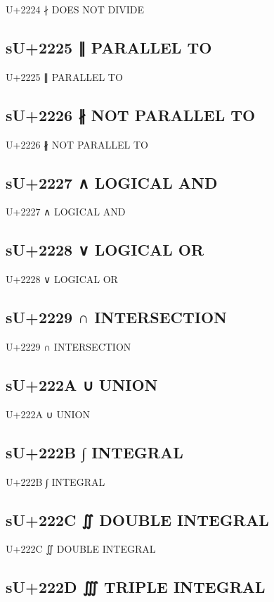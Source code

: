 U+2224 ∤ DOES NOT DIVIDE

\subsection{sU+2225 ∥ PARALLEL TO}

U+2225 ∥ PARALLEL TO

\subsection{sU+2226 ∦ NOT PARALLEL TO}

U+2226 ∦ NOT PARALLEL TO

\subsection{sU+2227 ∧ LOGICAL AND}

U+2227 ∧ LOGICAL AND

\subsection{sU+2228 ∨ LOGICAL OR}

U+2228 ∨ LOGICAL OR

\subsection{sU+2229 ∩ INTERSECTION}

U+2229 ∩ INTERSECTION

\subsection{sU+222A ∪ UNION}

U+222A ∪ UNION

\subsection{sU+222B ∫ INTEGRAL}

U+222B ∫ INTEGRAL

\subsection{sU+222C ∬ DOUBLE INTEGRAL}

U+222C ∬ DOUBLE INTEGRAL

\subsection{sU+222D ∭ TRIPLE INTEGRAL}

